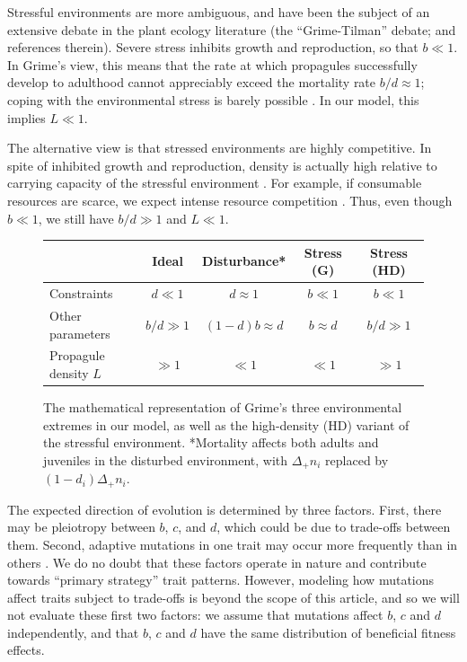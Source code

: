 \documentclass[11pt]{article}
\begin{document}
Stressful environments are more ambiguous, and have been the subject of an extensive debate in the plant ecology literature (the ``Grime-Tilman'' debate; \citealt{aerts_1999} and references therein). Severe stress inhibits growth and reproduction, so that $b\ll 1$. In Grime's view, this means that the rate at which propagules successfully develop to adulthood cannot appreciably exceed the mortality rate $b/d\approx 1$; coping with the environmental stress is barely possible \citep{grime_1974,grime_1977}. In our model, this implies $L\ll 1$. 

The alternative view is that stressed environments are highly competitive. In spite of inhibited growth and reproduction, density is actually high relative to carrying capacity of the stressful environment \citep{taylor_1990}. For example, if consumable resources are scarce, we expect intense resource competition \citep{davis_1998}. Thus, even though $b\ll 1$, we still have $b/d\gg 1$ and $L\ll 1$. 

\begin{figure}
\centering
\begin{tabular}{l*{4}{c}}
  & Ideal & Disturbance* & Stress (G) & Stress (HD) \\ \hline
  Constraints & $d \ll 1$ & $d \approx 1$ & $b \ll 1$ & $b \ll 1$ \\
  Other parameters & $b/d\gg 1$ & $(1-d)b\approx d$ & $b\approx d$ & $b/d\gg 1$ \\
  Propagule density $L$  & $\gg 1$ & $\ll 1$ & $\ll 1$ & $\gg 1$
\end{tabular}
\caption{\label{fig:table} The mathematical representation of Grime's three environmental extremes in our model, as well as the high-density (HD) variant of the stressful environment. *Mortality affects both adults and juveniles in the disturbed environment, with $\Delta_+ n_i$ replaced by $(1-d_i)\Delta_+ n_i$.}
\end{figure}

The expected direction of evolution is determined by three factors. First, there may be pleiotropy between $b$, $c$, and $d$, which could be due to trade-offs between them. Second, adaptive mutations in one trait may occur more frequently than in others \citep{yampolsky_2001}. We do no doubt that these factors operate in nature and contribute towards ``primary strategy'' trait patterns. However, modeling how mutations affect traits subject to trade-offs is beyond the scope of this article, and so we will not evaluate these first two factors: we assume that mutations affect $b$, $c$ and $d$ independently, and that $b$, $c$ and $d$ have the same distribution of beneficial fitness effects. 
\end{document}
